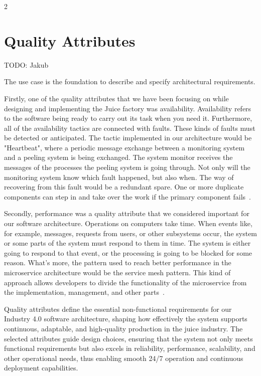 \documentclass{article}
\begin{document}
\begin{multicols}{2}
\section{Quality Attributes}
\color{red} TODO: Jakub

\color{blue}
The use case is the foundation to describe and specify architectural requirements.

\color{black}
Firstly, one of the quality attributes that we have been focusing on while designing and implementing the Juice factory was availability. Availability refers to the software being ready to carry out its task when you need it. Furthermore, all of the availability tactics are connected with faults. These kinds of faults must be detected or anticipated. The tactic implemented in our architecture would be "Heartbeat", where a periodic message exchange between a monitoring system and a peeling system is being exchanged. The system monitor receives the messages of the processes the peeling system is going through. Not only will the monitoring system know which fault happened, but also when. The way of recovering from this fault would be a redundant spare. One or more duplicate components can step in and take over the work if the primary component fails~\cite{b1}.

Secondly, performance was a quality attribute that we considered important for our software architecture. Operations on computers take time. When events like, for example, messages, requests from users, or other subsystems occur, the system or some parts of the system must respond to them in time. The system is either going to respond to that event, or the processing is going to be blocked for some reason. What's more, the pattern used to reach better performance in the microservice architecture would be the service mesh pattern. This kind of approach allows developers to divide the functionality of the microservice from the implementation, management, and other parts~\cite{b1}. 

Quality attributes define the essential non-functional requirements for our Industry 4.0 software architecture, shaping how effectively the system supports continuous, adaptable, and high-quality production in the juice industry. The selected attributes guide design choices, ensuring that the system not only meets functional requirements but also excels in reliability, performance, scalability, and other operational needs, thus enabling smooth 24/7 operation and continuous deployment capabilities.


\end{multicols}
\end{document}
